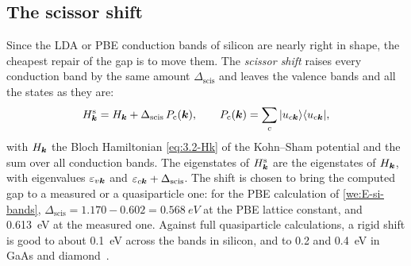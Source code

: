 \subsection{The scissor shift}

Since the LDA or PBE conduction bands of silicon are nearly right in shape, the cheapest repair of the gap is to move them. The \emph{scissor shift} raises every conduction band by the same amount $\Delta_{\mathrm{scis}}$ and leaves the valence bands and all the states as they are:
\begin{equation}
  H^{\mathrm{s}}_{\bm{k}} = H_{\bm{k}} + \Delta_{\mathrm{scis}}\,P_{\mathrm{c}}(\bm{k}), \qquad
  P_{\mathrm{c}}(\bm{k}) = \sum_c|u_{c\bm{k}}\rangle\langle u_{c\bm{k}}| ,
  \label{eq:3.4-scissor}
\end{equation}
with $H_{\bm{k}}$ the Bloch Hamiltonian \cref{eq:3.2-Hk} of the Kohn--Sham potential and the sum over all conduction bands. The eigenstates of $H^{\mathrm{s}}_{\bm{k}}$ are the eigenstates of $H_{\bm{k}}$, with eigenvalues $\varepsilon_{v\bm{k}}$ and $\varepsilon_{c\bm{k}} + \Delta_{\mathrm{scis}}$. The shift is chosen to bring the computed gap to a measured or a quasiparticle one: for the PBE calculation of \cref{we:E-si-bands}, $\Delta_{\mathrm{scis}} = 1.170 - 0.602 = \SI{0.568}{eV}$ at the PBE lattice constant, and \SI{0.613}{eV} at the measured one. Against full quasiparticle calculations, a rigid shift is good to about \SI{0.1}{eV} across the bands in silicon, and to 0.2 and \SI{0.4}{eV} in GaAs and diamond~\cite{godby1988self}\cite[Sect.~V\,B]{aryasetiawan1998gw}.

